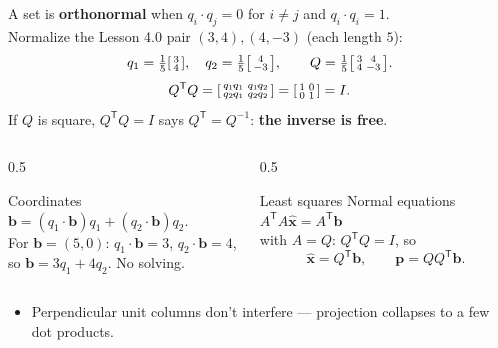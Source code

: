 \documentclass[aspectratio=169, 11pt]{beamer}
\newcommand{\xx}{\mathbf{x}}
\newcommand{\bb}{\mathbf{b}}
\newcommand{\pp}{\mathbf{p}}
\newcommand{\T}{\mathsf{T}}
\begin{document}
\begin{frame}[t, plain]
  A set is \textbf{orthonormal} when $q_i\cdot q_j=0$ for $i\ne j$ and $q_i\cdot q_i=1$.\\[4pt]
  Normalize the Lesson 4.0 pair $(3,4),(4,-3)$ (each length $5$):
  \[
    q_1=\tfrac15\begin{bsmallmatrix} 3\\4 \end{bsmallmatrix},\quad
    q_2=\tfrac15\begin{bsmallmatrix} 4\\-3 \end{bsmallmatrix},\qquad
    Q=\tfrac15\begin{bsmallmatrix} 3&4\\4&-3 \end{bsmallmatrix}.
  \]
  \[
    Q^{\T}Q=\begin{bsmallmatrix} q_1\!\cdot\!q_1 & q_1\!\cdot\!q_2\\ q_2\!\cdot\!q_1 & q_2\!\cdot\!q_2 \end{bsmallmatrix}
    =\begin{bsmallmatrix} 1&0\\0&1 \end{bsmallmatrix}=I.
  \]
  If $Q$ is square, $Q^{\T}Q=I$ says $Q^{\T}=Q^{-1}$: \textbf{the inverse is free}.
\end{frame}

\begin{frame}[t, plain]
  \begin{columns}[T]
    \begin{column}{0.5\textwidth}
      \begin{block}{Coordinates}
        $\bb=(q_1\!\cdot\!\bb)q_1+(q_2\!\cdot\!\bb)q_2$.\\[3pt]
        For $\bb=(5,0)$: $q_1\!\cdot\!\bb=3$, $q_2\!\cdot\!\bb=4$,\\[2pt]
        so $\bb=3q_1+4q_2$. No solving.
      \end{block}
    \end{column}
    \begin{column}{0.5\textwidth}
      \begin{block}{Least squares}
        Normal equations $A^{\T}A\hat{\xx}=A^{\T}\bb$\\[2pt]
        with $A=Q$: $Q^{\T}Q=I$, so
        \[
          \hat{\xx}=Q^{\T}\bb,\qquad \pp=QQ^{\T}\bb.
        \]
      \end{block}
    \end{column}
  \end{columns}
  \vspace{4pt}
  \begin{itemize}
    \item Perpendicular unit columns don't interfere --- projection collapses to a few dot products.
  \end{itemize}
\end{frame}
\end{document}
